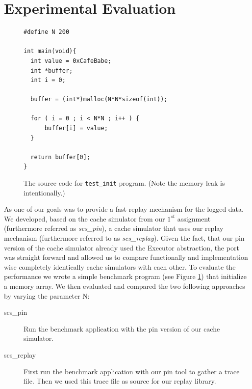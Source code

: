 \section{Experimental Evaluation}

\begin{figure}
  \lstset{language=C, basicstyle=\small}
  \begin{lstlisting}
#define N 200

int main(void){
  int value = 0xCafeBabe;
  int *buffer;
  int i = 0;

  buffer = (int*)malloc(N*N*sizeof(int));

  for ( i = 0 ; i < N*N ; i++ ) {
      buffer[i] = value;
  }

  return buffer[0];
}
  \end{lstlisting}
  \caption{The source code for \texttt{test\_init} program. (Note the memory leak is intentionally.)}
  \label{fig:test_init}
\end{figure}

As one of our goals was to provide a fast replay mechanism for the
logged data. We developed, based on the cache simulator from our
$1^{st}$ assignment (furthermore referred as \emph{scs\_pin}), a cache
simulator that uses our replay mechanism (furthermore referred to as
\emph{scs\_replay}). Given the fact, that our pin version of the cache
simulator already used the Executor abstraction, the port was straight
forward and allowed us to compare functionally and implementation wise
completely identically cache simulators with each other. To evaluate
the performance we wrote a simple benchmark program (see Figure
\ref{fig:test_init}) that initialize a memory array. We then evaluated
and compared the two following approaches by varying the parameter N:

\begin{description}
  \item[scs\_pin] Run the benchmark application with the pin version of
    our cache simulator.
  \item[scs\_replay] First run the benchmark application with our pin
    tool to gather a trace file. Then we used this trace file as
    source for our replay library.
\end{description}

